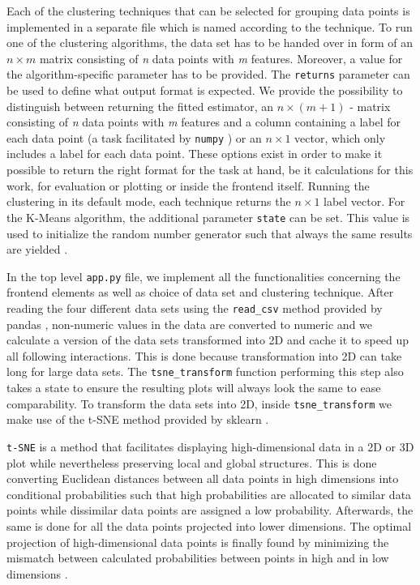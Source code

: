 Each of the clustering techniques that can be selected for grouping data points is implemented in a separate file which is named according to the technique. To run one of the clustering algorithms, the data set has to be handed over in form of an $n \times m$ matrix consisting of \textit{n} data points with \textit{m} features. Moreover, a value for the algorithm-specific parameter has to be provided. The \texttt{returns} parameter can be used to define what output format is expected. We provide the possibility to distinguish between returning the fitted estimator, an $n \times (m+1)$ - matrix consisting of \textit{n} data points with \textit{m} features and a column containing a label for each data point (a task facilitated by \texttt{numpy} \cite{harris2020array}) or an $n \times 1$ vector, which only includes a label for each data point. These options exist in order to make it possible to return the right format for the task at hand, be it calculations for this work, for evaluation or plotting or inside the frontend itself. Running the clustering in its default mode, each technique returns the $n \times 1$ label vector.
For the K-Means algorithm, the additional parameter \texttt{state} can be set. This value is used to initialize the random number generator such that always the same results are yielded \cite{sklearn_api}.

In the top level \texttt{app.py} file, we implement all the functionalities concerning the frontend elements as well as choice of data set and clustering technique. After reading the four different data sets using the \texttt{read_csv} method provided by pandas \cite{reback2020pandas, mckinney-proc-scipy-2010}, non-numeric values in the data are converted to numeric and we calculate a version of the data sets transformed into 2D and cache it to speed up all following interactions. This is done because transformation into 2D can take long for large data sets. The \texttt{tsne_transform} function performing this step also takes a state to ensure the resulting plots will always look the same to ease comparability. To transform the data sets into 2D, inside \texttt{tsne_transform} we make use of the \gls{t-SNE} method provided by \gls{sklearn} \cite{sklearn_api}.

\texttt{t-SNE} is a method that facilitates displaying high-dimensional data in a 2D or 3D plot while nevertheless preserving local and global structures. This is done converting Euclidean distances between all data points in high dimensions into conditional probabilities such that high probabilities are allocated to similar data points while dissimilar data points are assigned a low probability. Afterwards, the same is done for all the data points projected into lower dimensions. The optimal projection of high-dimensional data points is finally found by minimizing the mismatch between calculated probabilities between points in high and in low dimensions \cite{van2008visualizing}.

